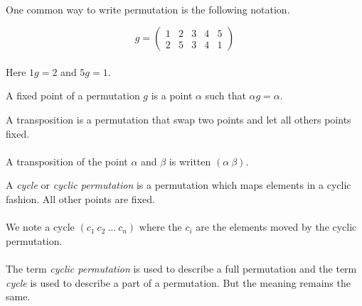 \paragraph{}
One common way to write permutation is the following notation.

\[
  g =
  \left(
    \begin{array}{ccccc}
      1 & 2 & 3 & 4 & 5\\
      2 & 5 & 3 & 4 & 1
    \end{array}
  \right)
\]

\paragraph{}
Here $1g = 2$ and $5g = 1$.

\begin{definition}
  A fixed point of a permutation $g$ is a point $\alpha$ such that $\alpha g = \alpha$.
\end{definition}

\begin{definition}[Transposition]
  A transposition is a permutation that swap two points and let all others points fixed.
\end{definition}

\paragraph{}
A transposition of the point $\alpha$ and $\beta$ is written $(\alpha\ \beta)$.

\begin{definition}[Cycle]
  A \textit{cycle} or \textit{cyclic permutation} is a permutation which maps elements in a cyclic fashion. All other points are fixed.
\end{definition}

\paragraph{}
We note a cycle $(c_1\ c_2\ \dots\ c_n)$ where the $c_i$ are the elements moved by the cyclic permutation.

\paragraph{}
The term \textit{cyclic permutation} is used to describe a full permutation and the term \textit{cycle} is used to describe a part of a permutation. But the meaning remains the same.

